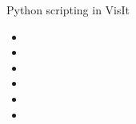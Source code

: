 \begin{frame}{Python scripting in VisIt}{}
  \begin{itemize}
  \item 
  \item 
  \item 
  \item 
  \item 
  \item 
  \end{itemize}
\end{frame}
